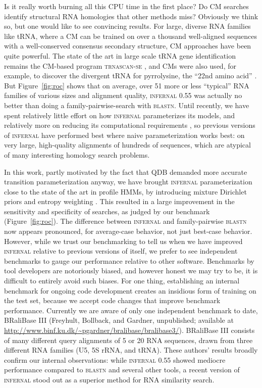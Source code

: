 \documentclass[11pt]{article}
\begin{document}
Is it really worth burning all this CPU time in the first place?  Do
CM searches identify structural RNA homologies that other methods
miss? Obviously we think so,
but one would like to see convincing results. For
large, diverse RNA families like tRNA, where a CM can be trained on
over a thousand well-aligned sequences with a well-conserved consensus
secondary structure, CM approaches have been quite powerful. The state
of the art in large scale tRNA gene identification remains the
CM-based program \textsc{trnascan-se} \cite{LoweEddy97}, and CMs were
also used, for example, to discover the divergent tRNA for
pyrrolysine, the ``22nd amino acid'' \cite{Srinivasan02}. But
Figure~\ref{fig:roc} shows that on average, over 51 more or less
``typical'' RNA families of various sizes and alignment quality,
\textsc{infernal} 0.55 was actually no better than doing a
family-pairwise-search with \textsc{blastn}.  Until recently, we have
spent relatively little effort on how \textsc{infernal} parameterizes
its models, and relatively more on reducing its computational
requirements \cite{Eddy02b}, so previous versions of \textsc{infernal}
have performed best where
naive parameterization works best: on very large, high-quality
alignments of hundreds of sequences, which are atypical of many
interesting homology search problems.

In this work, partly motivated by the fact that QDB demanded more
accurate transition parameterization anyway, we have brought
\textsc{infernal} parameterization close to the state of the art in
profile HMMs, by introducing mixture Dirichlet priors
\cite{Sjolander96} and entropy weighting \cite{Karplus98}. This
resulted in a large improvement in the sensitivity and specificity of
searches, as judged by our benchmark (Figure~\ref{fig:roc}). The
difference between \textsc{infernal} and family-pairwise
\textsc{blastn} now appears pronounced, for average-case behavior, not
just best-case behavior. However, while we trust our benchmarking to
tell us when we have improved \textsc{infernal} relative to previous
versions of itself, we prefer to see independent benchmarks to gauge
our performance relative to other software. Benchmarks by
tool developers are notoriously biased, and however honest we may try
to be, it is difficult to
entirely avoid such biases. For one thing, establishing an internal
benchmark for ongoing code development creates an insidious form of
training on the test set, because we accept code changes that improve
benchmark performance.  Currently we are aware of only one independent
benchmark to date, BRaliBase III (Freyhult, Bollback, and Gardner,
unpublished; available at
\url{http://www.binf.ku.dk/~pgardner/bralibase/bralibase3/}). BRaliBase
III consists of many different query alignments of 5 or 20 RNA
sequences, drawn from three different RNA families (U5, 5S rRNA, and
tRNA). These authors' results broadly confirm our internal
observations: while \textsc{infernal} 0.55 showed mediocre performance
compared to \textsc{blastn} and several other tools, a recent version
of \textsc{infernal} stood out as a superior method for RNA similarity
search.
\end{document}
